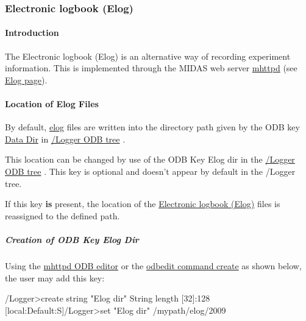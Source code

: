 \par
 

\label{index_end}
\hypertarget{index_end}{}
 \subsubsection{Electronic logbook (Elog)}\label{F_Elog}
\par
 

\par
 \label{F_Elog_idx_Elog_Introduction}
\hypertarget{F_Elog_idx_Elog_Introduction}{}
 \label{F_Elog_idx_Logging_Elog}
\hypertarget{F_Elog_idx_Logging_Elog}{}
 \hypertarget{F_Elog_F_Elog_Intro}{}\paragraph{Introduction}\label{F_Elog_F_Elog_Intro}
The Electronic logbook (Elog) is an alternative way of recording experiment information. This is implemented through the MIDAS web server \hyperlink{RC_mhttpd_utility}{mhttpd} (see \hyperlink{RC_mhttpd_Elog_page}{Elog page}).\hypertarget{F_Elog_F_Logger_Elog_Files_Location}{}\paragraph{Location of Elog Files}\label{F_Elog_F_Logger_Elog_Files_Location}
\label{F_Elog_F_Logger_Elog_Dir}
\hypertarget{F_Elog_F_Logger_Elog_Dir}{}
 \label{F_Elog_idx_Elog_Files_location}
\hypertarget{F_Elog_idx_Elog_Files_location}{}
 By default, \hyperlink{F_Elog}{elog} files are written into the directory path given by the ODB key \hyperlink{F_Logging_Data_F_Logger_Data_Dir}{Data Dir} in \hyperlink{F_Logging_Data_F_Logger_tree}{/Logger ODB tree} .

This location can be changed by use of the ODB Key Elog dir in the \hyperlink{F_Logging_Data_F_Logger_tree}{/Logger ODB tree} . This key is optional and doesn't appear by default in the /Logger tree. \par
 If this key {\bfseries is} present, the location of the \hyperlink{F_Elog}{Electronic logbook (Elog)} files is reassigned to the defined path.\hypertarget{F_Elog_F_Logger_Create_Elog_Dir}{}\subparagraph{Creation of ODB Key Elog Dir}\label{F_Elog_F_Logger_Create_Elog_Dir}
Using the \hyperlink{RC_mhttpd_ODB_page}{mhttpd ODB editor} or the \hyperlink{RC_odbedit_examples_RC_odbedit_cr}{odbedit command create} as shown below, the user may add this key: 
\begin{DoxyCode}
/Logger>create string "Elog dir"
String length [32]:128
[local:Default:S]/Logger>set "Elog dir" /mypath/elog/2009
\end{DoxyCode}


